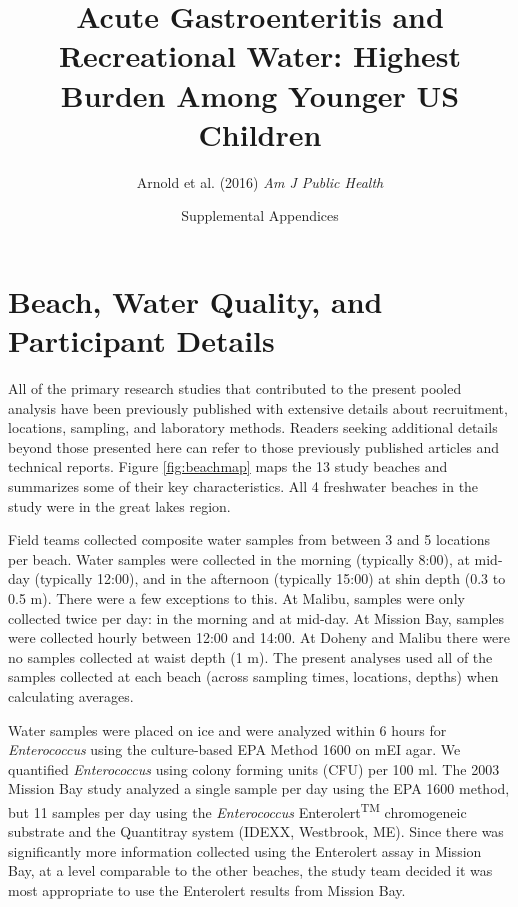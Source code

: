 \documentclass[12pt]{article}\usepackage[]{graphicx}\usepackage[]{color}
\title{Acute Gastroenteritis and Recreational Water: Highest Burden Among Younger US Children}
\author{Arnold et al. (2016) \textit{Am J Public Health}}
\date{Supplemental Appendices}
\begin{document}
\maketitle
\tableofcontents






\clearpage
\section{Beach, Water Quality, and Participant Details}

All of the primary research studies that contributed to the present pooled analysis have been previously published with extensive details about recruitment, locations, sampling, and laboratory methods. Readers seeking additional details beyond those presented here can refer to those previously published articles and technical reports.\supercite{Colford2005-nb, Colford2007-mc,Wade2006-pp,Wade2008-xj,Wade2010-bb,Wade2010-ps,Colford2012-um,Arnold2013-xd,Yau2014-pl} Figure \ref{fig:beachmap} maps the 13 study beaches and summarizes some of their key characteristics. All 4 freshwater beaches in the study were in the great lakes region. 

Field teams collected composite water samples from between 3 and 5 locations per beach. Water samples were collected in the morning (typically 8:00), at mid-day (typically 12:00), and in the afternoon (typically 15:00) at shin depth (0.3 to 0.5 m).  There were a few exceptions to this. At Malibu, samples were only collected twice per day: in the morning and at mid-day. At Mission Bay, samples were collected hourly between 12:00 and 14:00. At Doheny and Malibu there were no samples collected at waist depth (1 m).  The present analyses used all of the samples collected at each beach (across sampling times, locations, depths) when calculating averages.

Water samples were placed on ice and were analyzed within 6 hours for \textit{Enterococcus} using the culture-based EPA Method 1600\supercite{Epa2009-dm} on mEI agar.  We quantified \textit{Enterococcus} using colony forming units (CFU) per 100 ml.  The 2003 Mission Bay study analyzed a single sample per day using the EPA 1600 method, but 11 samples per day using the \textit{Enterococcus} Enterolert\textsuperscript{TM} chromogeneic substrate and the Quantitray system (IDEXX, Westbrook, ME). Since there was significantly more information collected using the Enterolert assay in Mission Bay, at a level comparable to the other beaches, the study team decided it was most appropriate to use the Enterolert results from Mission Bay.
\end{document}
